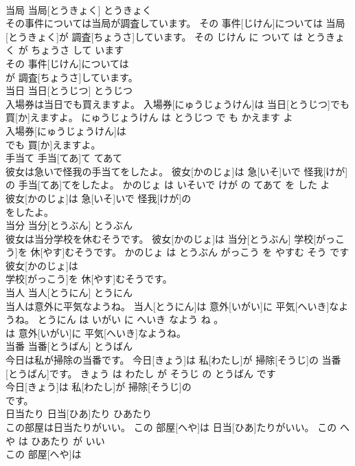 \documentclass[8pt]{extreport}
\begin{document}
\begin{CJK}{UTF8}{min}
\\	当局	当局[とうきょく]	とうきょく	
\\	その事件については当局が調査しています。	その 事件[じけん]については 当局[とうきょく]が 調査[ちょうさ]しています。	その じけん に ついて は とうきょく が ちょうさ して います	
\\	その 事件[じけん]については
\\	が 調査[ちょうさ]しています。			
\\	当日	当日[とうじつ]	とうじつ	
\\	入場券は当日でも買えますよ。	入場券[にゅうじょうけん]は 当日[とうじつ]でも 買[か]えますよ。	にゅうじょうけん は とうじつ で も かえます よ	
\\	入場券[にゅうじょうけん]は
\\	でも 買[か]えますよ。			
\\	手当て	手当[てあ]て	てあて	
\\	彼女は急いで怪我の手当てをしたよ。	彼女[かのじょ]は 急[いそ]いで 怪我[けが]の 手当[てあ]てをしたよ。	かのじょ は いそいで けが の てあて を した よ	
\\	彼女[かのじょ]は 急[いそ]いで 怪我[けが]の
\\	をしたよ。			
\\	当分	当分[とうぶん]	とうぶん	
\\	彼女は当分学校を休むそうです。	彼女[かのじょ]は 当分[とうぶん] 学校[がっこう]を 休[やす]むそうです。	かのじょ は とうぶん がっこう を やすむ そう です	
\\	彼女[かのじょ]は
\\	学校[がっこう]を 休[やす]むそうです。			
\\	当人	当人[とうにん]	とうにん	
\\	当人は意外に平気なようね。	当人[とうにん]は 意外[いがい]に 平気[へいき]なようね。	とうにん は いがい に へいき なよう ね 。	
\\	は 意外[いがい]に 平気[へいき]なようね。			
\\	当番	当番[とうばん]	とうばん	
\\	今日は私が掃除の当番です。	今日[きょう]は 私[わたし]が 掃除[そうじ]の 当番[とうばん]です。	きょう は わたし が そうじ の とうばん です	
\\	今日[きょう]は 私[わたし]が 掃除[そうじ]の
\\	です。			
\\	日当たり	日当[ひあ]たり	ひあたり	
\\	この部屋は日当たりがいい。	この 部屋[へや]は 日当[ひあ]たりがいい。	この へや は ひあたり が いい	
\\	この 部屋[へや]は

\end{CJK}
\end{document}
